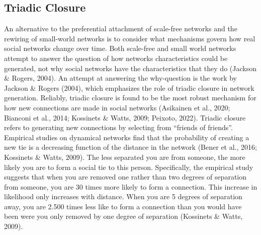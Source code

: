 \documentclass{article}
\begin{document}
\subsection{Triadic Closure}
An alternative to the preferential attachment of scale-free networks and the rewiring of small-world networks is to consider what mechanisms govern how real social networks change over time. Both scale-free and small world networks attempt to answer the question of how networks characteristics could be generated, not why social networks have the characteristics that they do (Jackson \& Rogers, 2004). An attempt at answering the why-question is the work by Jackson \& Rogers (2004), which emphasizes the role of triadic closure in network generation. Reliably, triadic closure is found to be the most robust mechanism for how new connections are made in social networks (Asikainen et al., 2020; Bianconi et al., 2014; Kossinets \& Watts, 2009; Peixoto, 2022). Triadic closure refers to generating new connections by selecting from “friends of friends”. Empirical studies on dynamical networks find that the probability of creating a new tie is a decreasing function of the distance in the network (Bener et al., 2016; Kossinets \& Watts, 2009). The less separated you are from someone, the more likely you are to form a social tie to this person. Specifically, the empirical study suggests that when you are removed one rather than two degrees of separation from someone, you are 30 times more likely to form a connection. This increase in likelihood only increases with distance. When you are 5 degrees of separation away, you are 2.500 times less like to form a connection than you would have been were you only removed by one degree of separation (Kossinets \& Watts, 2009). 
\end{document}
